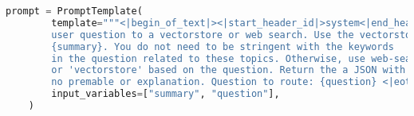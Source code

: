 \begin{lstlisting}[language=Python, caption=\it{Prompt used for the hallucination grader.}]
    prompt = PromptTemplate(
        template="""<|begin_of_text|><|start_header_id|>system<|end_header_id|> You are an expert at routing a 
        user question to a vectorstore or web search. Use the vectorstore for questions on LLM  agents, 
        {summary}. You do not need to be stringent with the keywords 
        in the question related to these topics. Otherwise, use web-search. Give a binary choice 'web_search' 
        or 'vectorstore' based on the question. Return the a JSON with a single key 'datasource' and 
        no premable or explanation. Question to route: {question} <|eot_id|><|start_header_id|>assistant<|end_header_id|>""",
        input_variables=["summary", "question"],
    )
\end{lstlisting}
